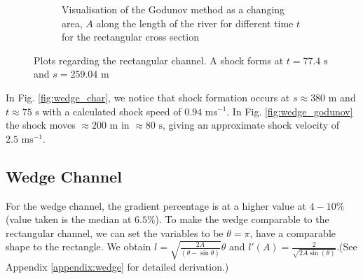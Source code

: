 \documentclass[12pt]{article}
\begin{document}
\begin{figure}[h]
\begin{subfigure}[b]{0.49\textwidth}
        \caption{Visualisation of the Godunov method as a changing area, $A$ along the length of the river for different time $t$ for the rectangular cross section}
        \label{fig:rect_godunov}
    \end{subfigure}
    \caption{Plots regarding the rectangular channel. A shock forms at $t = 77.4\text{ s}$ and $s = 259.04\text{ m}$}
\end{figure}

In Fig. \ref{fig:wedge_char}, we notice that shock formation occurs at $s\approx 380\text{ m}$ and $t\approx 75\text{ s}$ with a calculated shock speed of $ 0.94\text{ ms}^{-1}$. In Fig. \ref{fig:wedge_godunov} the shock moves $\approx200\text{ m}$ in $\approx 80 \text{ s}$, giving an approximate shock velocity of $ 2.5\text{ ms}^{-1}$.

\subsection{Wedge Channel}
For the wedge channel, the gradient percentage is at a higher value at $4-10\%$ (value taken is the median at $6.5\%$). To make the wedge comparable to the rectangular channel, we can set the variables to be $\theta = \pi$, have a comparable shape to the rectangle. We obtain $l =\sqrt{\frac{2A}{\left(\theta - \sin\theta\right)}}\theta$ and $l'(A) =\frac{2}{\sqrt{2A\sin(\theta)}}$.(See Appendix \ref{appendix:wedge} for detailed derivation.)
\end{document}
